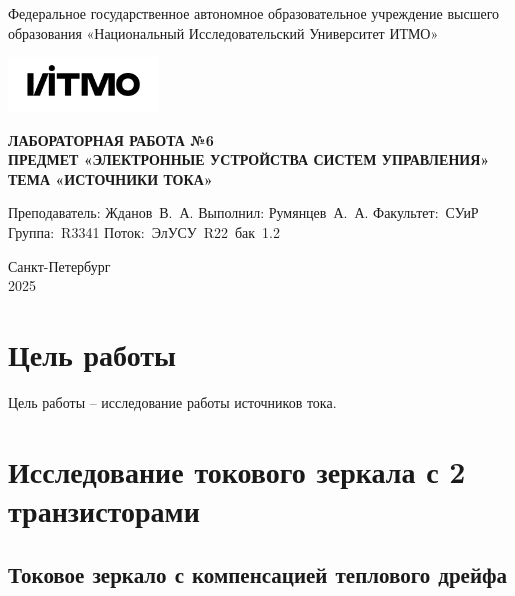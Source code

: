 \documentclass[a4paper, 12pt]{article}
\begin{document}
    \begin{titlepage}

        \begin{center}
        Федеральное государственное автономное образовательное учреждение высшего образования
        «Национальный Исследовательский Университет ИТМО»
        \vfill
        
        \includegraphics[width=0.3\textwidth]{itmo.png} %

        {\large\bf ЛАБОРАТОРНАЯ РАБОТА №6}\\
        {\large\bf ПРЕДМЕТ «ЭЛЕКТРОННЫЕ УСТРОЙСТВА СИСТЕМ УПРАВЛЕНИЯ»}\\
        {\large\bf ТЕМА «ИСТОЧНИКИ ТОКА»}
        \vfill

        \begin{flushright}
            \begin{minipage}{.45\textwidth}
            {
                \hbox{Преподаватель:}
                \hbox{Жданов В. А.}
                \hbox{}
                \hbox{Выполнил:}
                \hbox{Румянцев А. А.}
                \hbox{}
                \hbox{Факультет: СУиР}
                \hbox{Группа: R3341}
                \hbox{Поток: ЭлУСУ R22 бак 1.2}
            }
            \end{minipage}
        \end{flushright}
        \vfill
  
        Санкт-Петербург\\
        2025
        \end{center}
    \end{titlepage}
    
    \tableofcontents

    \newpage
    \section{Цель работы}
    Цель работы -- исследование работы источников тока.


    \section{Исследование токового зеркала с 2 транзисторами}
    \subsection{Токовое зеркало с компенсацией теплового дрейфа}
\end{document}
